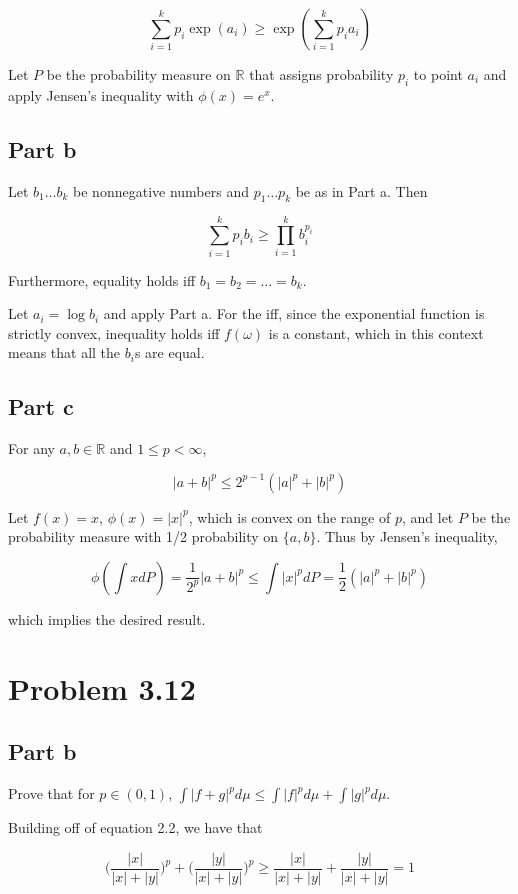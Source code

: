\documentclass{article}
\newcommand{\R}{\mathbb{R}}
\begin{document}
\[
\sum_{i=1}^kp_i\exp(a_i) \geq \exp\left( \sum_{i=1}^kp_ia_i \right)
\]

Let $P$ be the probability measure on $\R$ that assigns probability $p_i$ to point $a_i$ and apply Jensen's inequality with $\phi(x) = e^x$.

\subsection*{Part b}

Let $b_1 \dots b_k$ be nonnegative numbers and $p_1 \dots p_k$ be as in Part a. Then

\[
\sum_{i=1}^k p_ib_i \geq \prod_{i=1}^k b_i^{p_i}
\]

Furthermore, equality holds iff $b_1 = b_2 = \dots = b_k$.

Let $a_i = \log b_i$ and apply Part a. For the iff, since the exponential function is strictly convex, inequality holds iff $f(\omega)$ is a constant, which in this context means that all the $b_i$s are equal.

\subsection*{Part c}

For any $a, b \in \R$ and $1 \leq p < \infty$,

\[
|a+b|^p \leq 2^{p-1}(|a|^p + |b|^p)
\]

Let $f(x) = x$, $\phi(x) = |x|^p$, which is convex on the range of $p$, and let $P$ be the probability measure with 1/2 probability on $\{a, b\}$. Thus by Jensen's inequality,

\[
\phi\left( \int xdP \right) = \frac{1}{2^p}|a+b|^p \leq \int |x|^pdP = \frac{1}{2}(|a|^p + |b|^p)
\]

which implies the desired result.

\section*{Problem 3.12}

\subsection*{Part b}

Prove that for $p \in (0, 1)$, $\int |f+g|^pd\mu \leq \int|f|^pd\mu + \int|g|^pd\mu$.

Building off of equation 2.2, we have that

\[
\biggl( \frac{|x|}{|x|+|y|} \biggr)^p + \biggl( \frac{|y|}{|x|+|y|} \biggr)^p \geq \frac{|x|}{|x|+|y|} + \frac{|y|}{|x|+|y|} = 1
\]
\end{document}
